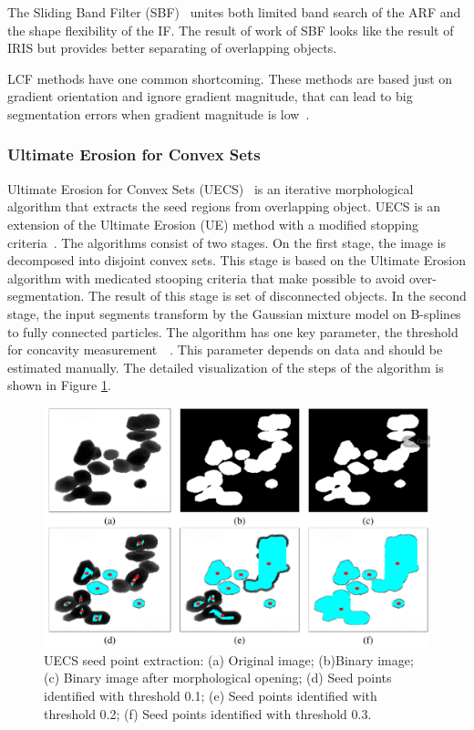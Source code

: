\documentclass{lutmscthesis}[2010/09/22]
\begin{document}
The Sliding Band Filter (SBF)~\cite{LCF-SBF} unites both limited band search of the ARF and the shape flexibility of the IF. 
The result of work of SBF looks like the result of IRIS but provides better separating of overlapping objects.


LCF methods have one common shortcoming. These methods are based just on gradient orientation and ignore gradient magnitude, that can lead to big segmentation errors when gradient magnitude
is low~\cite{LCF}. 



\subsubsection{Ultimate Erosion for Convex Sets}

Ultimate Erosion for Convex Sets (UECS)~\cite{UECS} is an iterative morphological algorithm that extracts
the seed regions from overlapping object. UECS is an extension of the Ultimate Erosion
(UE) method with a modified stopping criteria~\cite{UECS}. The algorithms consist of two stages. On the first stage, the image is decomposed into disjoint convex sets. This stage is based on the Ultimate Erosion algorithm with medicated stooping criteria that make possible to avoid over-segmentation. The result of this stage is set of disconnected objects. In the second stage, the input segments transform by the Gaussian mixture model on B-splines to fully connected particles. The algorithm has one key parameter, the threshold for concavity measurement~~\cite{zafari-thesis}. This parameter depends on data and should be estimated manually. 
The detailed visualization of the steps of the algorithm is shown in Figure \ref{fig:UECS-alg}.

\begin{figure} [ht]
  \includegraphics[width=\linewidth]{UECS.png}
  \caption{UECS seed point extraction: (a) Original image; 
    (b)Binary image; 
    (c) Binary image after morphological opening; 
    (d) Seed points identified with threshold 0.1;
    (e) Seed points identified with threshold 0.2;
    (f) Seed points identified with threshold 0.3.~\cite{zafari-thesis}}
  \label{fig:UECS-alg}
\end{figure}
\end{document}
